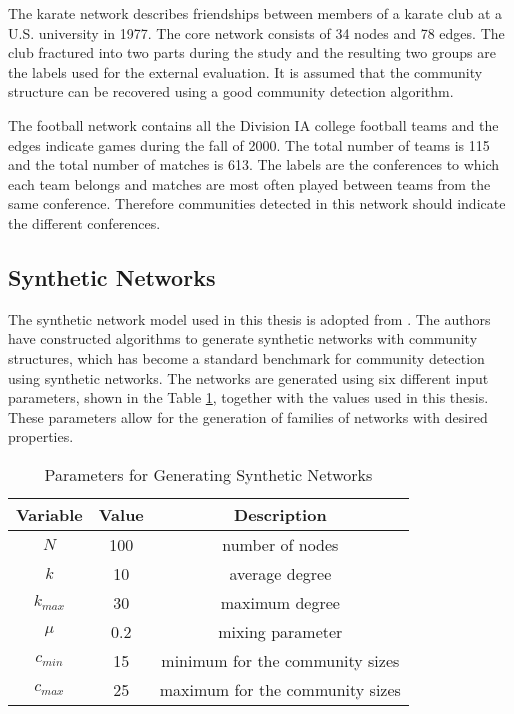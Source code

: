 \documentclass[\main/thesis.tex]{subfiles}
\begin{document}
The karate network \cite{zachary1977information} describes friendships between members of a karate club at a U.S. university in 1977. The core network consists of 34 nodes and 78 edges. The club fractured into two parts during the study and the resulting two groups are the labels used for the external evaluation. It is assumed that the community structure can be recovered using a good community detection algorithm.

The football network \cite{girvan2002community} contains all the Division IA college football teams and the edges indicate games during the fall of 2000. The total number of teams is 115 and the total number of matches is 613. The labels are the conferences to which each team belongs and matches are most often played between teams from the same conference. Therefore communities detected in this network should indicate the different conferences. 
\subsection*{Synthetic Networks}
The synthetic network model used in this thesis is adopted from \cite{lancichinetti2009benchmarks}. The authors have constructed algorithms to generate synthetic networks with community structures, which has become a standard benchmark for community detection using synthetic networks. The networks are generated using six different input parameters, shown in the Table \ref{synthetic_network_parameter}, together with the values used in this thesis. These parameters allow for the generation of families of networks with desired properties.
\begin{table}[]
\centering
\caption{Parameters for Generating Synthetic Networks}
\label{synthetic_network_parameter}
\begin{tabular}{ccc}
\hline
Variable & Value & Description                     \\ \hline
$N$     & 100   & number of nodes                 \\
$k$     & 10    & average degree                  \\
$k_{max}$  & 30    & maximum degree                  \\
$\mu$ & 0.2   & mixing parameter                \\
$c_{min}$  & 15    & minimum for the community sizes \\
$c_{max}$  & 25    & maximum for the community sizes \\ \hline
\end{tabular}
\end{table}
\end{document}
